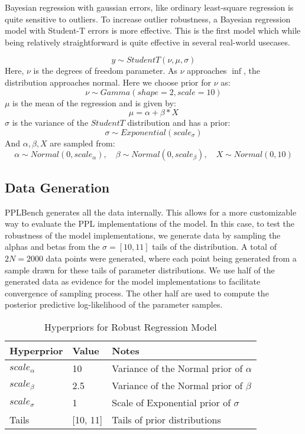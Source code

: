 \documentclass[../main.tex]{subfiles}
\begin{document}
Bayesian regression with gaussian errors, like ordinary least-square regression is quite sensitive to outliers\cite{rousseeuw2005robust}.
To increase outlier robustness, a Bayesian regression model with Student-T errors is more effective\cite{gelman2013bayesian}.
This is the first model which while being relatively straightforward is quite effective in several real-world usecases.

\begin{equation}
y \sim StudentT(\nu, \mu, \sigma)
\end{equation}
Here, $\nu$ is the degrees of freedom parameter.
As $\nu$ approaches $\inf$, the distribution approaches normal.
Here we choose prior for $\nu$ as:
$$
   \nu \sim Gamma(shape=2, scale=10)
$$
$\mu$ is the mean of the regression and is given by:
$$
\mu = \alpha + \beta * X
$$
$\sigma$ is the variance of the $StudentT$ distribution and has a prior:
$$
\sigma \sim  Exponential(scale_\sigma)
$$
And $\alpha, \beta, X$ are sampled from:
$$
\alpha \sim Normal(0, scale_\alpha), \quad \beta \sim Normal(0, scale_\beta), \quad X \sim Normal(0, 10)
$$

\subsection{Data Generation}
PPLBench generates all the data internally.
This allows for a more customizable way to evaluate the PPL implementations of the model.
In this case, to test the robustness of the model implementations, we generate data by sampling the alphas and betas from the $\sigma = [10, 11]$ tails of the distribution.
A total of $2N = 2000$ data points were generated, where each point being generated from a sample drawn for these  tails of parameter distributions.
We use half of the generated data as evidence for the model implementations to facilitate convergence of sampling process.
The other half are used to compute the posterior predictive log-likelihood of the parameter samples.
\begin{table}[h]
 \caption{Hyperpriors for Robust Regression Model}
  \centering
  \begin{tabular}{lll}              \\
    \cmidrule(r){1-3}
    Hyperprior      & Value     & Notes  \\
    \midrule
    $scale_\alpha$    & 10        & Variance of the Normal prior of $\alpha$    \\
    $scale_\beta$     & 2.5       & Variance of the Normal prior of $\beta$     \\
    $scale_\sigma$    & 1         & Scale of Exponential prior of $\sigma$      \\
    Tails             & [10, 11]    & Tails of prior distributions              \\
    \bottomrule
  \end{tabular}
  \label{tab:table_RR}
\end{table}
\end{document}
